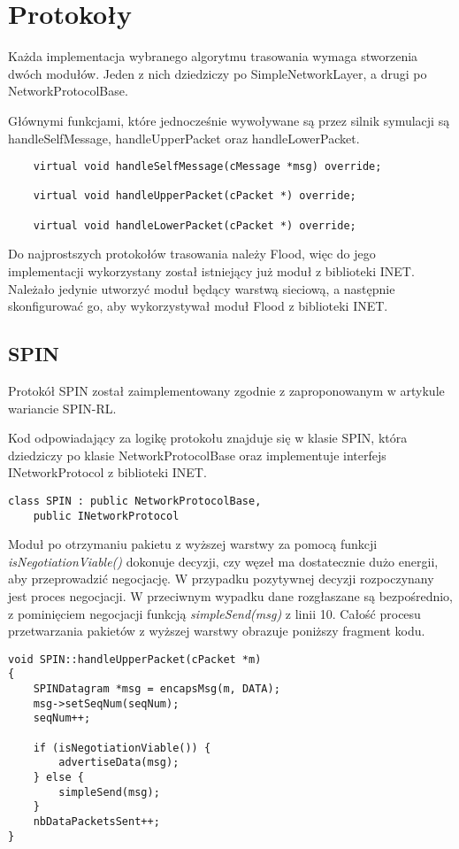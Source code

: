 \section{Protokoły}\label{sec:protocols}
Każda implementacja wybranego algorytmu trasowania wymaga stworzenia dwóch modułów. Jeden z nich dziedziczy po SimpleNetworkLayer, a drugi po NetworkProtocolBase.

Głównymi funkcjami, które jednocześnie wywoływane są przez silnik symulacji są handleSelfMessage, handleUpperPacket oraz handleLowerPacket.

\begin{verbatim}
    virtual void handleSelfMessage(cMessage *msg) override;

    virtual void handleUpperPacket(cPacket *) override;

    virtual void handleLowerPacket(cPacket *) override;
\end{verbatim}

Do najprostszych protokołów trasowania należy Flood, więc do jego implementacji wykorzystany został istniejący już moduł z biblioteki INET. Należało jedynie utworzyć  moduł będący warstwą sieciową, a następnie skonfigurować go, aby wykorzystywał moduł Flood z biblioteki INET.
\subsection{SPIN}
Protokół SPIN został zaimplementowany zgodnie z zaproponowanym w artykule \cite{Kulik2002} wariancie SPIN-RL.

Kod odpowiadający za logikę protokołu znajduje się w klasie SPIN, która dziedziczy po klasie NetworkProtocolBase oraz implementuje interfejs INetworkProtocol z biblioteki INET.

\begin{verbatim}
class SPIN : public NetworkProtocolBase,
    public INetworkProtocol
\end{verbatim}

Moduł po otrzymaniu pakietu z wyższej warstwy za pomocą funkcji \textit{isNegotiationViable()} dokonuje decyzji, czy węzeł ma dostatecznie dużo energii, aby przeprowadzić negocjację. W przypadku pozytywnej decyzji rozpoczynany jest proces negocjacji. W przeciwnym wypadku dane rozgłaszane są bezpośrednio, z pominięciem negocjacji funkcją \textit{simpleSend(msg)} z linii 10. Całość procesu przetwarzania pakietów z wyższej warstwy obrazuje poniższy fragment kodu.

\begin{verbatim}
void SPIN::handleUpperPacket(cPacket *m)
{
    SPINDatagram *msg = encapsMsg(m, DATA);
    msg->setSeqNum(seqNum);
    seqNum++;

    if (isNegotiationViable()) {
        advertiseData(msg);
    } else {
        simpleSend(msg);
    }
    nbDataPacketsSent++;
}
\end{verbatim}

